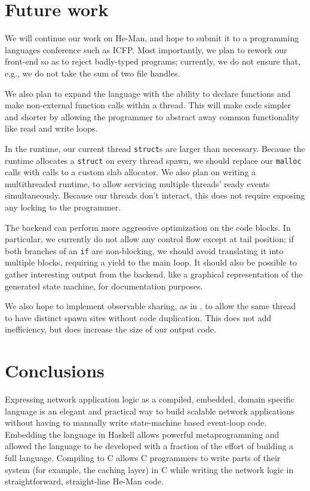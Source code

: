 \documentclass[preprint,11pt]{sigplanconf}
\renewcommand{\t}{\texttt}
\begin{document}

\section{Future work}

We will continue our work on He-Man, and hope to submit it to a programming
languages conference such as ICFP. Most importantly, we plan to rework our
front-end so as to reject badly-typed programs; currently, we do not ensure
that, e.g., we do not take the sum of two file handles.

We also plan to expand the language with the ability to declare functions and
make non-external function calls within a thread. This will make code simpler
and shorter by allowing the programmer to abstract away common functionality
like read and write loops.

In the runtime, our current thread \t{struct}s are larger than necessary.
Because the runtime allocates a \t{struct} on every thread spawn, we should
replace our \t{malloc} calls with calls to a custom slab allocator. We also plan
on writing a multithreaded runtime, to allow servicing multiple threads' ready
events simultaneously. Because our threads don't interact, this does not require
exposing any locking to the programmer.

The backend can perform more aggressive optimization on the code blocks. In
particular, we currently do not allow any control flow except at tail position;
if both branches of an \t{if} are non-blocking, we should avoid translating it
into multiple blocks, requiring a yield to the main loop. It should also be
possible to gather interesting output from the backend, like a graphical
representation of the generated state machine, for documentation purposes.

We also hope to implement observable sharing, as in \cite{Gill}, to allow the
same thread to have distinct spawn sites without code duplication. This does not
add inefficiency, but does increase the size of our output code. 

\section{Conclusions}
Expressing network application logic as a compiled, embedded, domain
specific language is an elegant and practical way to build scalable
network applications without having to manually write state-machine
based event-loop code. Embedding the language in Haskell allows
powerful metaprogramming and allowed the language to be developed with
a fraction of the effort of building a full language. Compiling to C
allows C programmers to write parts of their system (for example, the
caching layer) in C while writing the network logic in
straightforward, straight-line He-Man code.


{}

\end{document}
